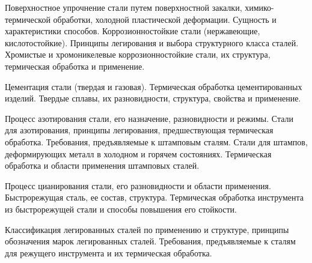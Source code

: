 \documentclass[
	14pt,
	a4paper,
	]
	{scrartcl}
\begin{document}
\vfill

\newpage


\shapk
{}
\setcounter{zad}{0}

\vfill
\z Поверхностное упрочнение стали путем поверхностной закалки, химико-термической обработки, холодной пластической деформации. Сущность и характеристики способов.
 \vfill
\z Коррозионностойкие стали (нержавеющие, кислотостойкие). Принципы легирования и выбора структурного класса сталей. Хромистые и хромоникелевые коррозионностойкие стали, их структура, термическая обработка и применение.
 \vfill

\vfill

\newpage


\shapk
{}
\setcounter{zad}{0}

\vfill
\z Цементация стали (твердая и газовая). Термическая обработка цементированных изделий.
 \vfill
\z Твердые сплавы, их разновидности, структура, свойства и применение.
 \vfill

\vfill

\newpage


\shapk
{}
\setcounter{zad}{0}

\vfill
\z Процесс азотирования стали, его назначение, разновидности и режимы. Стали для азотирования, принципы легирования, предшествующая термическая обработка.
 \vfill
\z Требования, предъявляемые к штамповым сталям. Стали для штампов, деформирующих металл в холодном и горячем состояниях. Термическая обработка и области применения штамповых сталей.
 \vfill

\vfill

\newpage


\shapk
{}
\setcounter{zad}{0}

\vfill
\z Процесс цианирования стали, его разновидности и области применения.
 \vfill
\z Быстрорежущая сталь, ее состав, структура. Термическая обработка инструмента из быстрорежущей стали и способы повышения его стойкости.
 \vfill

\vfill

\newpage


\shapk
{}
\setcounter{zad}{0}

\vfill
\z Классификация легированных сталей по применению и структуре, принципы обозначения марок легированных сталей.
 \vfill
\z Требования, предъявляемые к сталям для режущего инструмента и их термическая обработка.
 \vfill

\vfill
\end{document}
